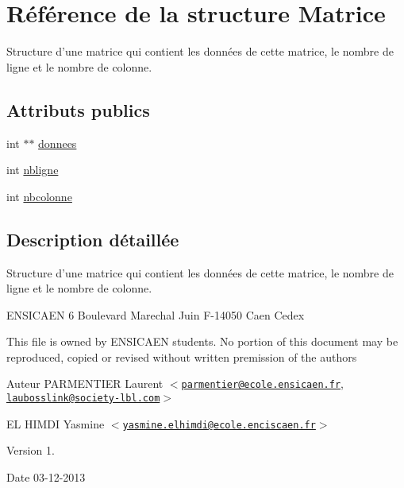 \hypertarget{structMatrice}{\section{\-Référence de la structure \-Matrice}
\label{structMatrice}
}


\-Structure d'une matrice qui contient les données de cette matrice, le nombre de ligne et le nombre de colonne.  


\subsection*{\-Attributs publics}
\begin{DoxyCompactItemize}
\item 
int $\ast$$\ast$ \hyperlink{structMatrice_a4ed59291b88d3ed8b30b3f74d4acf6b3}{donnees}
\item 
int \hyperlink{structMatrice_a27d7f184cab0fce2a40e173afca96f9f}{nbligne}
\item 
int \hyperlink{structMatrice_a7bf8157909d60e8ff841b26fc5cb2bab}{nbcolonne}
\end{DoxyCompactItemize}


\subsection{\-Description détaillée}
\-Structure d'une matrice qui contient les données de cette matrice, le nombre de ligne et le nombre de colonne. 

\-E\-N\-S\-I\-C\-A\-E\-N 6 \-Boulevard \-Marechal \-Juin \-F-\/14050 \-Caen \-Cedex

\-This file is owned by \-E\-N\-S\-I\-C\-A\-E\-N students. \-No portion of this document may be reproduced, copied or revised without written premission of the authors \begin{DoxyAuthor}{\-Auteur}
\-P\-A\-R\-M\-E\-N\-T\-I\-E\-R \-Laurent $<$\href{mailto:parmentier@ecole.ensicaen.fr}{\tt parmentier@ecole.\-ensicaen.\-fr}, \href{mailto:laubosslink@society-lbl.com}{\tt laubosslink@society-\/lbl.\-com}$>$ 

\-E\-L \-H\-I\-M\-D\-I \-Yasmine $<$\href{mailto:yasmine.elhimdi@ecole.enciscaen.fr}{\tt yasmine.\-elhimdi@ecole.\-enciscaen.\-fr}$>$ 
\end{DoxyAuthor}
\begin{DoxyVersion}{\-Version}
1. 
\end{DoxyVersion}
\begin{DoxyDate}{\-Date}
03-\/12-\/2013 
\end{DoxyDate}


